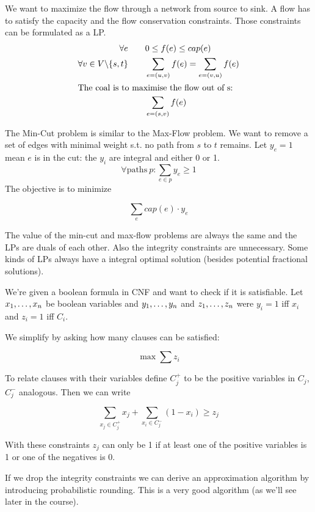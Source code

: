 \begin{itemize}
\begin{Ex} We want to maximize the flow through a network from source to sink. A flow has to satisfy the capacity and the flow conservation constraints. Those constraints can be formulated as a LP.
\begin{align*}
\forall e\qquad & 0\leq f(e)\leq cap(e)\\
\forall v\in V\backslash \{s,t\}\qquad & \sum_{e=(u,v)} f(e) = \sum_{e=(v,u)} f(e)\\
\intertext{The coal is to maximise the flow out of s:}
 &\sum_{e=(s,v)} f(e)
\end{align*}
\end{Ex}

\begin{Ex} The Min-Cut problem is similar to the Max-Flow problem. We want to remove a set of edges with minimal weight s.t. no path from $s$ to $t$ remains. Let $y_e=1$ mean $e$ is in the cut: the $y_i$ are integral and either 0 or 1.
\[\forall \mbox{paths}\ p: \sum_{e\in p} y_e \geq 1\]
The objective is to minimize 

\[\sum_e cap(e)\cdot y_e\]

The value of the min-cut and max-flow problems are always the same and the LPs are duals of each other. Also the integrity constraints are unnecessary. Some kinds of LPs always have a integral optimal solution (besides potential fractional solutions).
\end{Ex}

\begin{Ex}[Satisfiability] We're given a boolean formula in CNF and want to check if it is satisfiable. Let ${x}_1,\ldots,{x}_n$ be boolean variables and ${y}_1,\ldots,{y}_n$ and ${z}_1,\ldots,{z}_n$ were $y_i=1$ iff $x_i$ and $z_i=1$ iff $C_i$.

We simplify by asking how many clauses can be satisfied:

\[\max \sum z_i\]

To relate clauses with their variables define $C_j^+$ to be the positive variables in $C_j$, $C_j^-$ analogous. Then we can write 

\[\sum_{x_j\in C_j^+} x_j + \sum_{x_i \in C_j^-} (1-x_i) \geq z_j\]

With these constraints $z_j$ can only be 1 if at least one of the positive variables is 1 or one of the negatives is 0.

If we drop the integrity constraints we can derive an approximation algorithm by introducing probabilistic rounding. This is a very good algorithm (as we'll see later in the course).
\end{Ex}
\end{itemize}